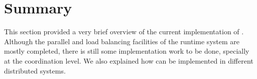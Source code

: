 \section{Summary}

This section provided a very brief overview of the current implementation of \lang. Although the parallel and load balancing facilities of the
runtime system are mostly completed, there is still some implementation work to be done, specially at the coordination level.
We also explained how \lang can be implemented in different distributed systems.
